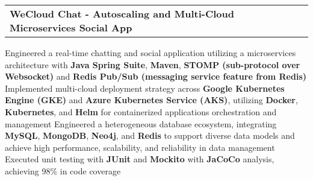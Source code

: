 \newcommand{\resumeProjEntry}[2]{
    \vspace{5pt}\item
      \begin{tabular*}{0.97\textwidth}{l@{\extracolsep{\fill}}r}
        \textbf{#1} & \small #2\\
      \end{tabular*}\vspace{-5pt}
}


\resumeProjEntry
{WeCloud Chat - Autoscaling and Multi-Cloud Microservices Social App}
{}
{
    \resumeItemListStart
        \resumeItem
        {Engineered a real-time chatting and social application utilizing a microservices architecture with \textbf{Java Spring Suite}, \textbf{Maven}, \textbf{STOMP (sub-protocol over Websocket)} and \textbf{Redis Pub/Sub (messaging service feature from Redis)}}
        \resumeItem
        {Implemented multi-cloud deployment strategy across \textbf{Google Kubernetes Engine (GKE)} and \textbf{Azure Kubernetes Service (AKS)}, utilizing \textbf{Docker}, \textbf{Kubernetes}, and \textbf{Helm} for containerized applications orchestration and management}
        \resumeItem
        {Engineered a heterogeneous database ecosystem, integrating \textbf{MySQL}, \textbf{MongoDB}, \textbf{Neo4j}, and \textbf{Redis} to support diverse data models and achieve high performance, scalability, and reliability in data management}
        \resumeItem
        {Executed unit testing with \textbf{JUnit} and \textbf{Mockito} with \textbf{JaCoCo} analysis, achieving 98\% in code coverage}
    \resumeItemListEnd
}



